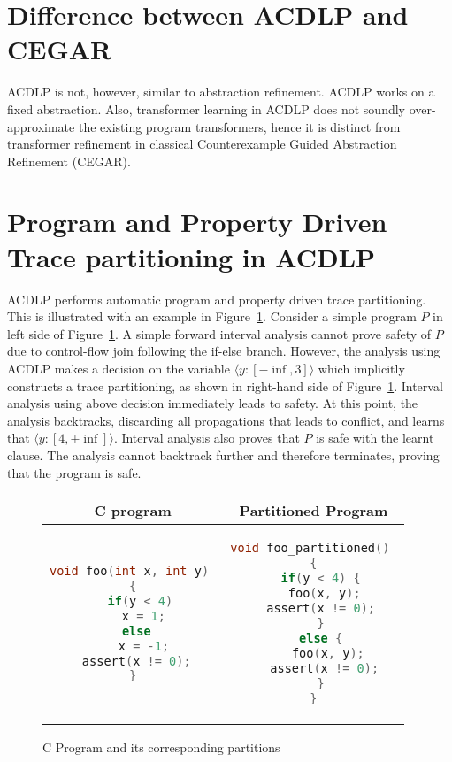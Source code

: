 \section{Difference between ACDLP and CEGAR}
%
ACDLP is not, however, similar to abstraction refinement. ACDLP works on a fixed abstraction.  
Also, transformer learning in ACDLP does not soundly over-approximate the existing program 
transformers, hence it is distinct from transformer refinement in classical Counterexample 
Guided Abstraction Refinement (CEGAR).
%

%
\section{Program and Property Driven Trace partitioning in ACDLP}
ACDLP performs automatic program and property driven trace partitioning. 
This is illustrated with an example in Figure~\ref{fig:tp}. Consider a 
simple program $P$ in left side of Figure~\ref{fig:tp}.  A simple forward 
interval analysis cannot prove safety of $P$ due to control-flow join 
following the if-else branch.  However, the analysis using ACDLP makes a decision 
on the variable $\langle y: [-\inf, 3] \rangle$ which implicitly constructs
a trace partitioning, as shown in right-hand side of Figure~\ref{fig:tp}. 
Interval analysis using above decision immediately leads to safety.  At 
this point, the analysis backtracks, discarding all propagations that leads to conflict, 
and learns that $\langle y: [4, +\inf] \rangle$.  Interval analysis also proves that 
$P$ is safe with the learnt clause.  The analysis cannot backtrack further and 
therefore terminates, proving that the program is safe.  
% 
\begin{figure}[htbp]
\centering
\begin{tabular}{c|c}
\hline
C program & Partitioned Program \\
\hline
\scriptsize
\begin{lstlisting}[mathescape=true,language=C]
void foo(int x, int y) 
{
  if(y < 4)
   x = 1;
  else 
   x = -1;
  assert(x != 0); 
}
\end{lstlisting}
&
\begin{lstlisting}[mathescape=true,language=C]
void foo_partitioned() 
{
  if(y < 4) {
   foo(x, y);
   assert(x != 0); 
  }
  else {
    foo(x, y);
    assert(x != 0); 
  }
}
\end{lstlisting}
\\
\hline
\end{tabular}
\caption{\label{fig:tp}
C Program and its corresponding partitions}
\end{figure}
